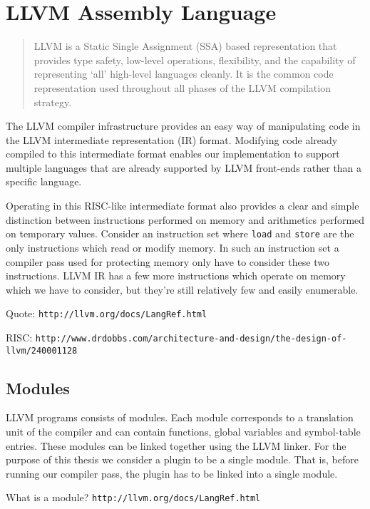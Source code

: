 \chapter {LLVM Assembly Language}

\begin{quote}
LLVM is a Static Single Assignment (SSA) based representation that provides
type safety, low-level operations, flexibility, and the capability of
representing `all' high-level languages cleanly. It is the common code
representation used throughout all phases of the LLVM compilation strategy.
\end{quote}

\noindent The LLVM compiler infrastructure provides an easy way of manipulating
code in the LLVM intermediate representation (IR) format. Modifying code
already compiled to this intermediate format enables our implementation to
support multiple languages that are already supported by LLVM front-ends rather
than a specific language.

Operating in this RISC-like intermediate format also provides a clear and
simple distinction between instructions performed on memory and arithmetics
performed on temporary values. Consider an instruction set where \texttt{load}
and \texttt{store} are the only instructions which read or modify memory. In
such an instruction set a compiler pass used for protecting memory only have to
consider these two instructions. LLVM IR has a few more instructions which
operate on memory which we have to consider, but they're still relatively few
and easily enumerable.

Quote: \texttt{http://llvm.org/docs/LangRef.html}

RISC: \texttt{http://www.drdobbs.com/architecture-and-design/the-design-of-llvm/240001128}


\section {Modules}

LLVM programs consists of modules. Each module corresponds to a translation
unit of the compiler and can contain functions, global variables and
symbol-table entries. These modules can be linked together using the LLVM
linker. For the purpose of this thesis we consider a plugin to be a single
module. That is, before running our compiler pass, the plugin has to be linked
into a single module.

What is a module? \texttt{http://llvm.org/docs/LangRef.html}


